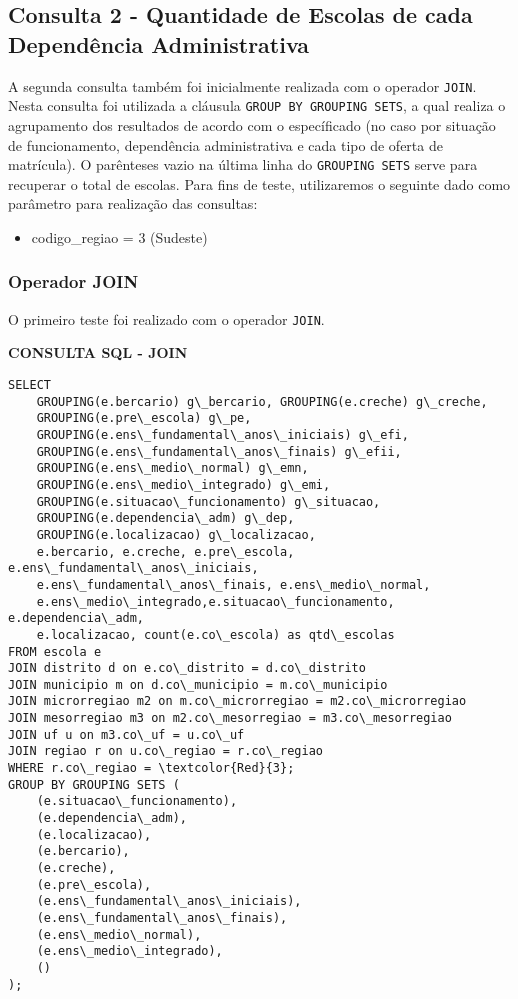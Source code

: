 \documentclass[12pt,a4paper]{article}
\begin{document}
\subsection{Consulta 2 - Quantidade de Escolas de cada Dependência Administrativa}

A segunda consulta também foi inicialmente realizada com o operador \texttt{JOIN}. Nesta consulta foi utilizada a cláusula \texttt{GROUP BY GROUPING SETS}, a qual realiza o agrupamento dos resultados de acordo com o específicado (no caso por situação de funcionamento, dependência administrativa e cada tipo de oferta de matrícula). O parênteses vazio na última linha do \texttt{GROUPING SETS} serve para recuperar o total de escolas. Para fins de teste, utilizaremos o seguinte dado como parâmetro para realização das consultas: 
\begin{itemize}
    \item codigo\_regiao = 3 (Sudeste)
\end{itemize}

\subsubsection{Operador JOIN}

O primeiro teste foi realizado com o operador \texttt{JOIN}.

\vspace{0.5cm}
\begin{flushleft}
\textbf{CONSULTA SQL - JOIN}\\
\end{flushleft}

\begin{Verbatim}[commandchars=\\\{\}]
SELECT
    GROUPING(e.bercario) g\_bercario, GROUPING(e.creche) g\_creche, 
    GROUPING(e.pre\_escola) g\_pe,
    GROUPING(e.ens\_fundamental\_anos\_iniciais) g\_efi,
    GROUPING(e.ens\_fundamental\_anos\_finais) g\_efii, 
    GROUPING(e.ens\_medio\_normal) g\_emn,
    GROUPING(e.ens\_medio\_integrado) g\_emi, 
    GROUPING(e.situacao\_funcionamento) g\_situacao,
    GROUPING(e.dependencia\_adm) g\_dep, 
    GROUPING(e.localizacao) g\_localizacao,
    e.bercario, e.creche, e.pre\_escola, e.ens\_fundamental\_anos\_iniciais,
    e.ens\_fundamental\_anos\_finais, e.ens\_medio\_normal,
    e.ens\_medio\_integrado,e.situacao\_funcionamento, e.dependencia\_adm, 
    e.localizacao, count(e.co\_escola) as qtd\_escolas
FROM escola e
JOIN distrito d on e.co\_distrito = d.co\_distrito
JOIN municipio m on d.co\_municipio = m.co\_municipio
JOIN microrregiao m2 on m.co\_microrregiao = m2.co\_microrregiao
JOIN mesorregiao m3 on m2.co\_mesorregiao = m3.co\_mesorregiao
JOIN uf u on m3.co\_uf = u.co\_uf
JOIN regiao r on u.co\_regiao = r.co\_regiao
WHERE r.co\_regiao = \textcolor{Red}{3};
GROUP BY GROUPING SETS (
    (e.situacao\_funcionamento),
    (e.dependencia\_adm),
    (e.localizacao),
    (e.bercario),
    (e.creche),
    (e.pre\_escola),
    (e.ens\_fundamental\_anos\_iniciais),
    (e.ens\_fundamental\_anos\_finais),
    (e.ens\_medio\_normal),
    (e.ens\_medio\_integrado),
    ()
);
\end{Verbatim}
\end{document}
